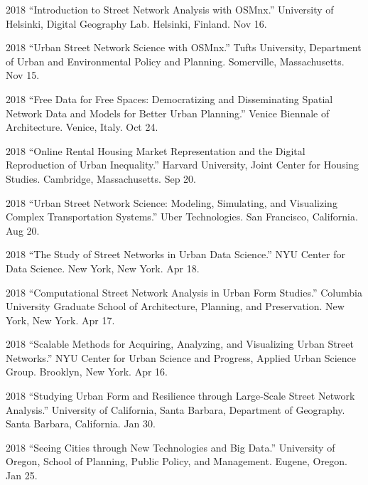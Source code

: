 \documentclass[11pt,letterpaper]{report} %
\begin{document}
\begin{tablist}
        \item[2018] \tab{}\enquote{Introduction to Street Network Analysis with OSMnx.} University of Helsinki, Digital Geography Lab. Helsinki, Finland. Nov 16.

        \item[2018] \tab{}\enquote{Urban Street Network Science with OSMnx.} Tufts University, Department of Urban and Environmental Policy and Planning. Somerville, Massachusetts. Nov 15.

        \item[2018] \tab{}\enquote{Free Data for Free Spaces: Democratizing and Disseminating Spatial Network Data and Models for Better Urban Planning.} Venice Biennale of Architecture. Venice, Italy. Oct 24.

        \item[2018] \tab{}\enquote{Online Rental Housing Market Representation and the Digital Reproduction of Urban Inequality.} Harvard University, Joint Center for Housing Studies. Cambridge, Massachusetts. Sep 20.

        \item[2018] \tab{}\enquote{Urban Street Network Science: Modeling, Simulating, and Visualizing Complex Transportation Systems.} Uber Technologies. San Francisco, California. Aug 20.

        \item[2018] \tab{}\enquote{The Study of Street Networks in Urban Data Science.} NYU Center for Data Science. New York, New York. Apr 18.

        \item[2018] \tab{}\enquote{Computational Street Network Analysis in Urban Form Studies.} Columbia University Graduate School of Architecture, Planning, and Preservation. New York, New York. Apr 17.

        \item[2018] \tab{}\enquote{Scalable Methods for Acquiring, Analyzing, and Visualizing Urban Street Networks.} NYU Center for Urban Science and Progress, Applied Urban Science Group. Brooklyn, New York. Apr 16.

        \item[2018] \tab{}\enquote{Studying Urban Form and Resilience through Large-Scale Street Network Analysis.} University of California, Santa Barbara, Department of Geography. Santa Barbara, California. Jan 30.

        \item[2018] \tab{}\enquote{Seeing Cities through New Technologies and Big Data.} University of Oregon, School of Planning, Public Policy, and Management. Eugene, Oregon. Jan 25.


\end{tablist}
\end{document}
